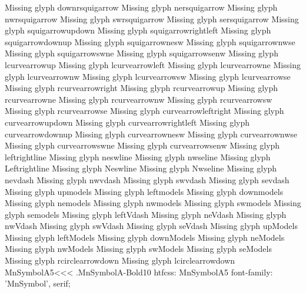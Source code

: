 Missing glyph	downrsquigarrow
Missing glyph	nersquigarrow
Missing glyph	nwrsquigarrow
Missing glyph	swrsquigarrow
Missing glyph	sersquigarrow
Missing glyph	squigarrowupdown
Missing glyph	squigarrowrightleft
Missing glyph	squigarrowdownup
Missing glyph	squigarrownesw
Missing glyph	squigarrownwse
Missing glyph	squigarrowswne
Missing glyph	squigarrowsenw
Missing glyph	lcurvearrowup
Missing glyph	lcurvearrowleft
Missing glyph	lcurvearrowne
Missing glyph	lcurvearrownw
Missing glyph	lcurvearrowsw
Missing glyph	lcurvearrowse
Missing glyph	rcurvearrowright
Missing glyph	rcurvearrowup
Missing glyph	rcurvearrowne
Missing glyph	rcurvearrownw
Missing glyph	rcurvearrowsw
Missing glyph	rcurvearrowse
Missing glyph	curvearrowleftright
Missing glyph	curvearrowupdown
Missing glyph	curvearrowrightleft
Missing glyph	curvearrowdownup
Missing glyph	curvearrownesw
Missing glyph	curvearrownwse
Missing glyph	curvearrowswne
Missing glyph	curvearrowsenw
Missing glyph	leftrightline
Missing glyph	neswline
Missing glyph	nwseline
Missing glyph	Leftrightline
Missing glyph	Neswline
Missing glyph	Nwseline
Missing glyph	nevdash
Missing glyph	nwvdash
Missing glyph	swvdash
Missing glyph	sevdash
Missing glyph	upmodels
Missing glyph	leftmodels
Missing glyph	downmodels
Missing glyph	nemodels
Missing glyph	nwmodels
Missing glyph	swmodels
Missing glyph	semodels
Missing glyph	leftVdash
Missing glyph	neVdash
Missing glyph	nwVdash
Missing glyph	swVdash
Missing glyph	seVdash
Missing glyph	upModels
Missing glyph	leftModels
Missing glyph	downModels
Missing glyph	neModels
Missing glyph	nwModels
Missing glyph	swModels
Missing glyph	seModels
Missing glyph	rcirclearrowdown
Missing glyph	lcirclearrowdown
\<MnSymbolA5\><<<
.MnSymbolA-Bold10
htfcss:  MnSymbolA5  font-family: 'MnSymbol', serif;

